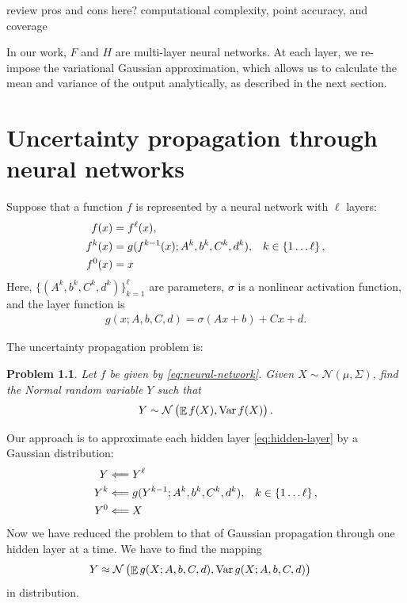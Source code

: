 \documentclass[oneside, article]{memoir}
\newtheorem{problem}{Problem}
\DeclareMathOperator{\expect}{\mathbb{E}}
\DeclareMathOperator{\Var}{\operatorname{Var}}
\begin{document}
{\color{red} review pros and cons here? computational complexity,
point accuracy, and coverage}

In our work, \(F\) and \(H\) are multi-layer neural networks.
At each layer, we re-impose the variational Gaussian approximation,
which allows us to calculate the mean and variance of the output
analytically, as described in the next section.

\chapter{Uncertainty propagation through neural networks}
Suppose that a function \(f\) is represented by a neural network with
\(\ell\) layers:
\begin{subequations}
  \label{eq:neural-network}
  \begin{align}
    f(x) &= f^\ell(x), \\
    f^k(x) &= g(f^{k-1}(x); A^k, b^k, C^k, d^k), & k \in \cbr{1 \ldots \ell},
    \label{eq:hidden-layer}
    \\
    f^0(x) &= x
  \end{align}
\end{subequations}
Here, \(\{(A^k, b^k, C^k, d^k)\}_{k=1}^\ell\) are parameters,
\(\sigma\) is a nonlinear activation function, and the layer function is
\begin{align}
  g(x; A, b, C, d) = \sigma(A x+ b) + C x + d.
\end{align}

The uncertainty propagation problem is:
\begin{problem}
  Let \(f\) be given by \eqref{eq:neural-network}.
  Given \(X \sim \mathcal N(\mu, \Sigma)\), find the Normal random
  variable \(Y\) such that
  \begin{align*}
    Y \sim \mathcal N\del{\expect f(X), \Var f(X)}.
  \end{align*}
\end{problem}

Our approach is to approximate each hidden layer
\eqref{eq:hidden-layer} by a Gaussian distribution:
\begin{subequations}
  \label{eq:neural-network-gaussian}
  \begin{align}
    Y &\Longleftarrow Y^\ell
    \\
    Y^k &\Longleftarrow g(Y^{k-1}; A^k, b^k, C^k, d^k), & k \in
    \cbr{1 \ldots \ell},
    \label{eq:hidden-layer-gaussian}
    \\
    Y^0 &\Longleftarrow X
  \end{align}
\end{subequations}
Now we have reduced the problem to that of Gaussian propagation
through one hidden layer at a time.
We have to find the mapping
\begin{align}
  Y &\approx \mathcal{N}\del{\expect g(X; A, b, C, d), \Var g(X; A, b, C, d)}
\end{align}
in distribution.
\end{document}
